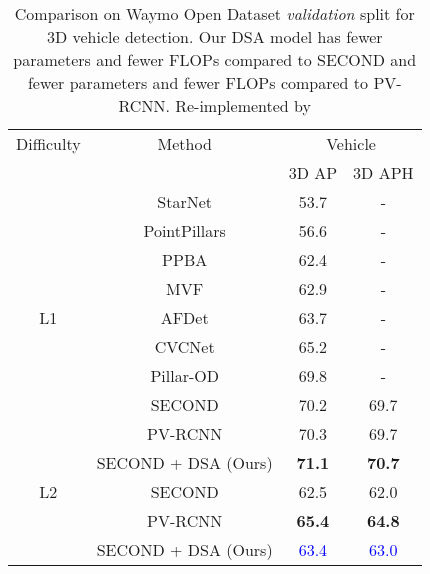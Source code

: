 \documentclass[10pt,twocolumn,letterpaper]{article}
\begin{document}
\begin{table}[t]
\footnotesize
\begin{center}
\begin{tabular}{c||c||c|c}
\hline 
Difficulty  & Method & \multicolumn{2}{c}{Vehicle} \\
\cline{3-4}
 &   &  3D AP & 3D APH \\
\hline
& StarNet \cite{starnet} & 53.7 & - \\
& PointPillars \cite{pointpillars} & 56.6 & -  \\
& PPBA \cite{ppba} & 62.4 & -  \\
& MVF \cite{MV3D} & 62.9 & -  \\
L1 & AFDet \cite{afdet} & 63.7 & -  \\
& CVCNet \cite{cvcnet} & 65.2 & -  \\
& Pillar-OD \cite{pillar-od} & 69.8 & -  \\
& SECOND \cite{SECOND} & 70.2 & 69.7 \\
& PV-RCNN \cite{PVRCNN} & 70.3 & 69.7 \\ 
& SECOND + DSA (Ours) & \textbf{71.1} & \textbf{70.7} \\

\hline
L2 & SECOND \cite{SECOND} & 62.5 & 62.0 \\
& PV-RCNN \cite{PVRCNN} & \textbf{65.4} & \textbf{64.8} \\
& SECOND + DSA (Ours) & \textcolor{blue}{63.4} & \textcolor{blue}{63.0} \\
\hline
\end{tabular}
\end{center}
\vspace{-0.2cm}
\caption{Comparison on Waymo Open Dataset \textit{validation} split for 3D vehicle detection. Our DSA model has  fewer parameters and  fewer FLOPs compared to SECOND and  fewer parameters and  fewer FLOPs compared to PV-RCNN. Re-implemented by \cite{OpenPCDet}}
\label{tab:waymo_val}
\vspace{-0.5 cm}
\end{table} 
\end{document}
